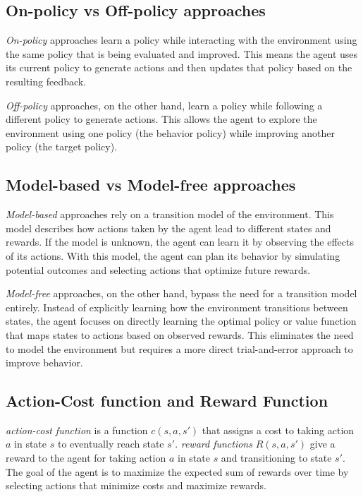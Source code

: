\subsection{On-\gls{policy} vs Off-\gls{policy} approaches}

\emph{On-\gls{policy}} approaches learn a \gls{policy} while interacting with the environment using the same \gls{policy} that is being evaluated and improved. This means the \gls{agent} uses its current \gls{policy} to generate actions and then updates that \gls{policy} based on the resulting feedback. 

\emph{Off-\gls{policy}} approaches, on the other hand, learn a \gls{policy} while following a different \gls{policy} to generate actions. This allows the \gls{agent} to explore the environment using one \gls{policy} (the behavior \gls{policy}) while improving another \gls{policy} (the target \gls{policy}).

\subsection{Model-based vs Model-free approaches}

\emph{Model-based} approaches rely on a \gls{transition model} of the environment. This model describes how actions taken by the \gls{agent} lead to different states and rewards. If the model is unknown, the \gls{agent} can learn it by observing the effects of its actions. With this model, the \gls{agent} can plan its behavior by simulating potential outcomes and selecting actions that optimize future rewards.

\emph{Model-free} approaches, on the other hand, bypass the need for a \gls{transition model} entirely. Instead of explicitly learning how the environment transitions between states, the \gls{agent} focuses on directly learning the optimal \gls{policy} or value function that maps states to actions based on observed rewards. This eliminates the need to model the environment but requires a more direct trial-and-error approach to improve behavior.

\subsection{Action-Cost function and Reward Function}

\emph{\gls{action-cost function}} is a function $c(s, a, s')$ that assigns a cost to taking action $a$ in state $s$ to eventually reach state $s'$.
\emph{\gls{reward function}s} $R(s, a, s')$ give a reward to the \gls{agent} for taking action $a$ in state $s$ and transitioning to state $s'$. The goal of the \gls{agent} is to maximize the expected sum of rewards over time by selecting actions that minimize costs and maximize rewards.

